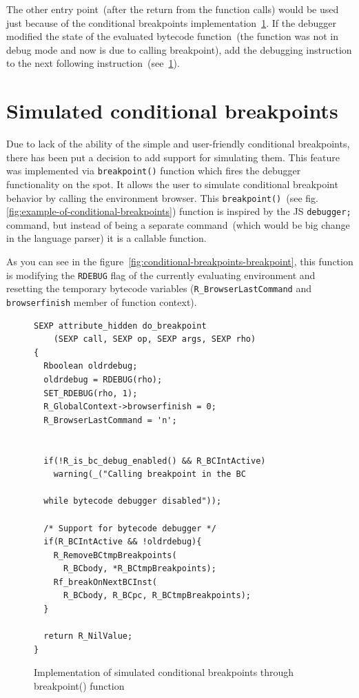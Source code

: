\documentclass[thesis=M,english]{FITthesis}[2018/10/20]
\newcommand{\code}[1]{\texttt{#1}}
\begin{document}
{The other entry point~(after the return from the function calls) would be used just because of the conditional breakpoints implementation~\ref{conditional-breakpoints}. If the debugger modified the state of the evaluated bytecode function~(the function was not in debug mode and now is due to calling breakpoint), add the debugging instruction to the next following instruction~(see~\ref{conditional-breakpoints}).

\section{Simulated conditional breakpoints}\label{conditional-breakpoints}

Due to lack of the ability of the simple and user-friendly conditional breakpoints, there has been put a decision to add support for simulating them. This feature was implemented via \code{breakpoint()} function which fires the debugger functionality on the spot. It allows the user to simulate conditional breakpoint behavior by calling the environment browser. This \code{breakpoint()}~(see fig. \ref{fig:example-of-conditional-breakpoints}) function is inspired by the JS \code{debugger;} command, but instead of being a separate command~(which would be big change in the language parser) it is a callable function.

As you can see in the figure~\ref{fig:conditional-breakpoints-breakpoint}, this function is modifying the \code{RDEBUG} flag of the currently evaluating environment and resetting the temporary bytecode variables (\code{R{\_}BrowserLastCommand} and \code{browserfinish} member of function context).

\begin{figure}[H]
\begin{lstlisting}
SEXP attribute_hidden do_breakpoint
	(SEXP call, SEXP op, SEXP args, SEXP rho)
{
  Rboolean oldrdebug;
  oldrdebug = RDEBUG(rho);
  SET_RDEBUG(rho, 1);
  R_GlobalContext->browserfinish = 0;
  R_BrowserLastCommand = 'n';


  if(!R_is_bc_debug_enabled() && R_BCIntActive)
    warning(_("Calling breakpoint in the BC

  while bytecode debugger disabled"));

  /* Support for bytecode debugger */
  if(R_BCIntActive && !oldrdebug){
    R_RemoveBCtmpBreakpoints(
      R_BCbody, *R_BCtmpBreakpoints);
    Rf_breakOnNextBCInst(
      R_BCbody, R_BCpc, R_BCtmpBreakpoints);
  }

  return R_NilValue;
}
\end{lstlisting}
	\caption{Implementation of simulated conditional breakpoints through breakpoint() function}\label{fig:conditional-breakpoints-breakpoint}\label{simulated-conditional-breakpoints}
\end{figure}

}
\end{document}
